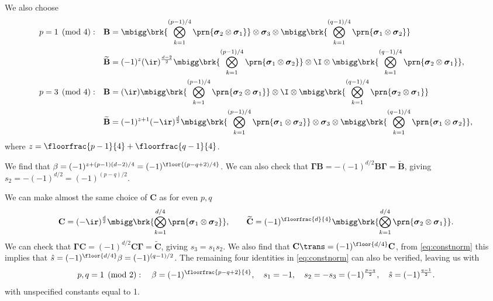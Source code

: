 \documentclass[11pt]{article}
\newcommand{\Gammab}{\boldsymbol{\Gamma}}
\newcommand{\B}{\mathbf{B}}
\renewcommand{\C}{\mathbf{C}}
\newcommand{\Bt}{\widetilde{\mathbf{B}}}
\newcommand{\Ct}{\widetilde{\mathbf{C}}}
\newcommand{\sigmab}{\boldsymbol{\sigma}}
\begin{document}
We also choose
%
\begin{equation*}
\begin{aligned}
  p &= 1 \pmod 4: &
  \B &= \mbigg\brk{\bigotimes_{k=1}^{(p-1)/4} \prn{\sigmab_2 \otimes \sigmab_1}} \otimes
        \sigmab_3 \otimes
        \mbigg\brk{\bigotimes_{k=1}^{(q-1)/4} \prn{\sigmab_1 \otimes \sigmab_2}} \\ &&
  \Bt &= (-1)^{z} (\ir)^{\frac{d-2}{2}}
        \mbigg\brk{\bigotimes_{k=1}^{(p-1)/4} \prn{\sigmab_1 \otimes \sigmab_2}} \otimes
        \I \otimes
        \mbigg\brk{\bigotimes_{k=1}^{(q-1)/4} \prn{\sigmab_2 \otimes \sigmab_1}},
  \\
  p &= 3 \pmod 4: &
  \B &= (\ir)
        \mbigg\brk{\bigotimes_{k=1}^{(p-1)/4} \prn{\sigmab_2 \otimes \sigmab_1}} \otimes
        \I \otimes
        \mbigg\brk{\bigotimes_{k=1}^{(q-1)/4} \prn{\sigmab_2 \otimes \sigmab_1}} \\ &&
  \Bt &= (-1)^{z + 1} (-\ir)^{\frac{d}{2}}
        \mbigg\brk{\bigotimes_{k=1}^{(p-1)/4} \prn{\sigmab_1 \otimes \sigmab_2}} \otimes
        \sigmab_3 \otimes
        \mbigg\brk{\bigotimes_{k=1}^{(q-1)/4} \prn{\sigmab_1 \otimes \sigmab_2}},
\end{aligned}
\end{equation*}
%
where $z = \floorfrac{p-1}{4} + \floorfrac{q-1}{4}$.

We find that \( \beta = (-1)^{z + (p-1)(d-2)/4} = (-1)^{\floor{(p-q+2)/4}} \).
We can also check that $\Gammab \B = -(-1)^{d/2}\B \Gammab = \Bt$, giving $s_2 = -(-1)^{d/2} = (-1)^{(p-q)/2}$.


We can make almost the same choice of $\C$ as for even $p,q$
%
\begin{equation*}
  \C =  (-\ir)^{\frac{d}{2}}
        \mbigg\brk{\bigotimes_{k=1}^{d/4} \prn{\sigmab_1 \otimes \sigmab_2}},
  \qquad
  \Ct = (-1)^{\floorfrac{d}{4}}
        \mbigg\brk{\bigotimes_{k=1}^{d/4} \prn{\sigmab_2 \otimes \sigmab_1}}.
\end{equation*}
%
We can check that $\Gammab \C = (-1)^{d/2}\C \Gammab = \Ct$, giving $s_3 = s_1 s_2$.
We also find that $\C\trans = (-1)^{\floor{d/4}} \C$, from \cref{eq:constnorm} this implies that
\( \hat{s} = (-1)^{\floor{d/4}} \beta = (-1)^{(q-1)/2} \).
The remaining four identities in \cref{eq:constnorm} can also be verified, leaving us with
%
\begin{equation}\label{eq:constoddodd}
  p, q = 1 \pmod 2 : \quad
  \beta = (-1)^{\floorfrac{p-q+2}{4}}, \quad
  s_1 = -1, \quad
  s_2 = -s_3 = (-1)^{\frac{p-q}{2}}, \quad
  \hat{s} = (-1)^{\frac{q-1}{2}}.
\end{equation}
%
with unspecified constants equal to 1.
\end{document}
